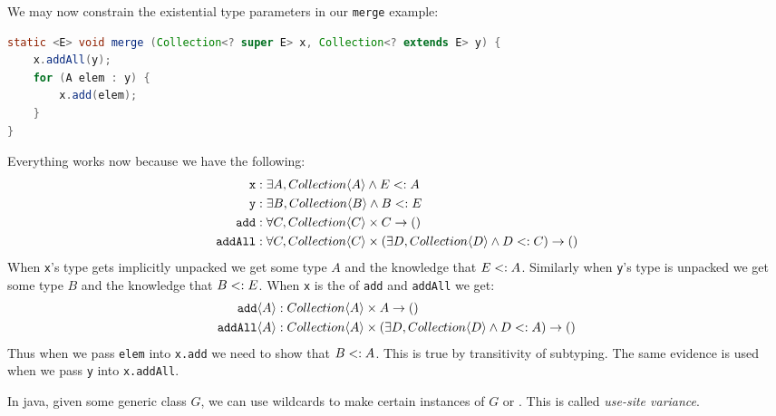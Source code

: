 \documentclass{article}
\begin{document}
\begin{example}
We may now constrain the existential type parameters in our \texttt{merge} example:
\begin{lstlisting}[escapechar=|, language=Java]
static <E> void merge (Collection<? super E> x, Collection<? extends E> y) {
    x.addAll(y);
    for (A elem : y) {
        x.add(elem);
    }
}
\end{lstlisting}
Everything works now because we have the following:
\begin{align*}
\texttt{x} &: \exists A, Collection \langle A \rangle \wedge E <: A \\
\texttt{y} &: \exists B, Collection \langle B \rangle \wedge B <: E \\
\texttt{add} &: \forall C, Collection \langle C \rangle \times C \rightarrow () \\
\texttt{addAll} &: \forall C, Collection \langle C \rangle \times (\exists D, Collection \langle D \rangle \wedge D <: C) \rightarrow () \\
\end{align*}
When \texttt{x}'s type gets implicitly unpacked we get some type $A$ and the knowledge that $E <: A$.
Similarly when \texttt{y}'s type is unpacked we get some type $B$ and the knowledge that $B <: E$.
When \texttt{x} is the \receiver{} of \texttt{add} and \texttt{addAll} we get:
\begin{align*}
\texttt{add} \langle A \rangle &: Collection \langle A \rangle \times A \rightarrow () \\
\texttt{addAll} \langle A \rangle &: Collection \langle A \rangle \times (\exists D, Collection \langle D \rangle \wedge D <: A) \rightarrow () \\
\end{align*}
Thus when we pass \texttt{elem} into \texttt{x.add} we need to show that $B <: A$.
This is true by transitivity of subtyping.
The same evidence is used when we pass \texttt{y} into \texttt{x.addAll}.
\end{example}

In java, given some generic class $G$, we can use wildcards to make certain instances of $G$ \covar{} or \contra{}.
This is called \textit{use-site variance}.
\end{document}
